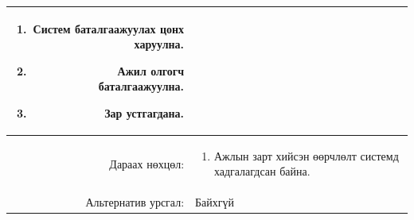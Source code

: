 \begin{longtable}{|r|p{11.5cm}|}
{\begin{enumerate}[nosep]
\begin{enumerate}[nosep,label*=\arabic*.]
                \item Систем баталгаажуулах цонх харуулна.
                \item Ажил олгогч баталгаажуулна.
                \item Зар устгагдана.
            \end{enumerate}
    \end{enumerate}}\\ \hline
    {Дараах нөхцөл:} & {\begin{enumerate}[nosep]
        \item Ажлын зарт хийсэн өөрчлөлт системд хадгалагдсан байна.
    \end{enumerate}}\\ \hline
    {Альтернатив урсгал:} & {Байхгүй}\\ \hline
\end{longtable}

